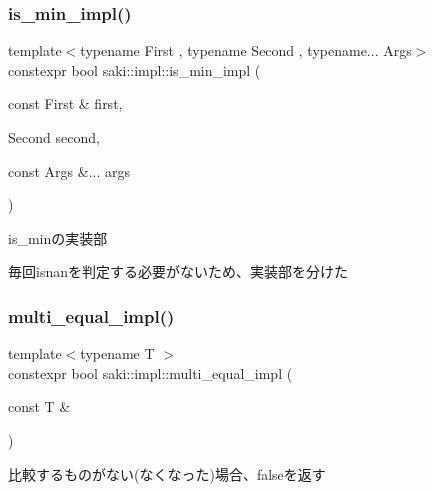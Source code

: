 \subsubsection{\texorpdfstring{is\+\_\+min\+\_\+impl()}{is\_min\_impl()}\hspace{0.1cm}{\footnotesize\ttfamily [2/2]}}
{\footnotesize\ttfamily template$<$typename First , typename Second , typename... Args$>$ \\
constexpr bool saki\+::impl\+::is\+\_\+min\+\_\+impl (\begin{DoxyParamCaption}\item[{const First \&}]{first,  }\item[{Second}]{second,  }\item[{const Args \&...}]{args }\end{DoxyParamCaption})}



is\+\_\+minの実装部 

毎回isnanを判定する必要がないため、実装部を分けた \mbox{\label{namespacesaki_1_1impl_ac271639854025a923addee4879780f96}} 
\subsubsection{\texorpdfstring{multi\+\_\+equal\+\_\+impl()}{multi\_equal\_impl()}\hspace{0.1cm}{\footnotesize\ttfamily [1/2]}}
{\footnotesize\ttfamily template$<$typename T $>$ \\
constexpr bool saki\+::impl\+::multi\+\_\+equal\+\_\+impl (\begin{DoxyParamCaption}\item[{const T \&}]{ }\end{DoxyParamCaption})}



比較するものがない(なくなった)場合、falseを返す 

\mbox{\label{namespacesaki_1_1impl_a45ac6c0cbcb74e4c612f3b66352defff}} 
